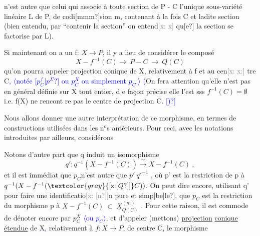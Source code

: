 \documentclass[11pt]{article}
\newcommand{\scanpage}[1]{\par\bigskip\noindent{\small\sffamily[scan #1]}\par}
\newcommand{\mspage}[1]{{\small\sffamily[p.\,#1]}}
\newcommand{\hand}[1]{\textcolor{blue}{#1}}
\newcommand{\inserted}[2][]{\textcolor{blue}{$\langle$#2$\rangle$}}
\newcommand{\xout}[1]{\textcolor{gray}{[\textsf{x:} #1]}}
\newcommand{\uline}[1]{\underline{#1}}
\newcommand{\unsure}[1]{[#1?]}
\newenvironment{diagramblock}{\par\begin{center}}{\end{center}\par}
\begin{document}
n'est autre que celui qui associe à toute section de  P - C  l'unique
sous-variété linéaire  L de P, de codi\unsure{mmm}sion m, contenant à la fois C
et ladite section  (bien entendu, par ``contenir la section'' on entend\xout{x} qu\unsure{e}
la section se factorise par L).

Si maintenant on a un f: $X \longrightarrow P$,  il y a lieu de considérer le
composé
\[ X - f^{-1}(C) \longrightarrow\ P - C \ \longrightarrow\ Q(C) \]
qu'on pourra appeler projection conique de X, relativement à f et au cen\xout{x:}%
tre C\hand{,} \inserted{notée \unsure{$p^{f}_{C}$|$p^{\Sigma}$} ou $p^{X}_{C}$ ou simplement $p_{C}$.} \hand{(}On fera attention qu'elle n'est pas en général définie sur X tout
entier, d e façon précise elle l'est sss $f^{-1}(C)=\emptyset$ i.e. f(X) ne rencont re
pas le centre de projection C. \hand{\unsure{)}}

Nous allons donner une autre interprétation de ce morphisme, en
termes de constructions utilisées dans les n$^{\text{o}}$s antérieurs.  Pour ceci,
avec les notations introduites par ailleurs, considérons
\begin{diagramblock}
\end{diagramblock}
Notons d'autre part que  q  induit un  isomorphisme
\[ q':q^{-1}(X-f^{-1}(C)) \xrightarrow{\ \sim\ } X - f^{-1}(C) \ , \]
et il est immédiat que  $p_{C}$n'est autre  que   $p'\ q'^{-1}$ , où p' est la
restriction de  p à  $q^{-1}(X-f^{-1}(\xout{\unsure{Q}}C))$.  On peut dire encore, utilisant q'
pour faire une identificatio\xout{\unsure{n}}n pure et simp\unsure{be|le}, que  $p_{C}$ est la restriction
du morphisme p  à  $X - f^{-1}(C) \ \subset\ \underline{X}^{(m)}_{Q(C)}$ . Pour cette raison, il est
commode de dénoter encore par  $p^{X}_{C}$ \inserted{ou $p_{C}$}, et d'appeler  (mettons)  \uline{projection}
\uline{conique}  \uline{étendue}  de X\hand{,} relativement à $f:X\rightarrow P$, de centre C, le morphisme

\mspage{85}

\clearpage
\scanpage{25/86}
\mspage{\hand{\unsure{80}}}
\end{document}
